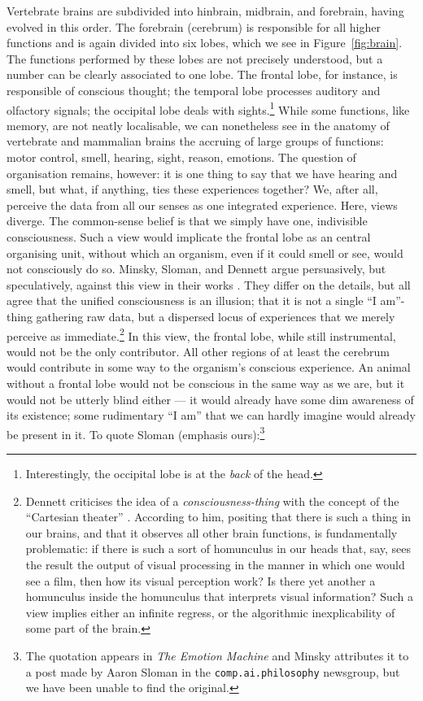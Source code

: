 Vertebrate brains are subdivided into hinbrain, midbrain, and forebrain, having evolved in this order. The forebrain (cerebrum) is responsible for all higher functions and is again divided into six lobes, which we see in Figure~\ref{fig:brain}. The functions performed by these lobes are not precisely understood, but a number can be clearly associated to one lobe. The frontal lobe, for instance, is responsible of conscious thought; the temporal lobe processes auditory and olfactory signals; the occipital lobe deals with sights.\footnote{Interestingly, the occipital lobe is at the {\em back} of the head.} While some functions, like memory, are not neatly localisable, we can nonetheless see in the anatomy of vertebrate and mammalian brains the accruing of large groups of functions: motor control, smell, hearing, sight, reason, emotions. The question of organisation remains, however: it is one thing to say that we have hearing and smell, but what, if anything, ties these experiences together? We, after all, perceive the data from all our senses as one integrated experience. Here, views diverge. The common-sense belief is that we simply have one, indivisible consciousness. Such a view would implicate the frontal lobe as an central organising unit, without which an organism, even if it could smell or see, would not consciously do so. Minsky, Sloman, and Dennett argue persuasively, but speculatively, against this view in their works \cite{emotionMachine,societyOfMind,sloman1991, dennett1991}. They differ on the details, but all agree that the unified consciousness is an illusion; that it is not a single ``I am''-thing gathering raw data, but a dispersed locus of experiences that we merely perceive as immediate.\footnote{Dennett criticises the idea of a \emph{consciousness-thing} with the concept of the ``Cartesian theater'' \cite{dennett1991}. According to him, positing that there is such a thing in our brains, and that it observes all other brain functions, is fundamentally problematic: if there is such a sort of homunculus in our heads that, say, sees the result the output of visual processing in the manner in which one would see a film, then how its visual perception work? Is there yet another a homunculus inside the homunculus that interprets visual information? Such a view implies either an infinite regress, or the algorithmic inexplicability of some part of the brain.} In this view, the frontal lobe, while still instrumental, would not be the only contributor. All other regions of at least the cerebrum would contribute in some way to the organism's conscious experience. An animal without a frontal lobe would not be conscious in the same way as we are, but it would not be utterly blind either --- it would already have some dim awareness of its existence; some rudimentary ``I am'' that we can hardly imagine would already be present in it. To quote Sloman (emphasis ours):\footnote{The quotation appears in {\em The Emotion Machine} \cite[p.\ 97]{emotionMachine} and Minsky attributes it to a post made by Aaron Sloman in the \texttt{comp.ai.philosophy} newsgroup, but we have been unable to find the original.}
